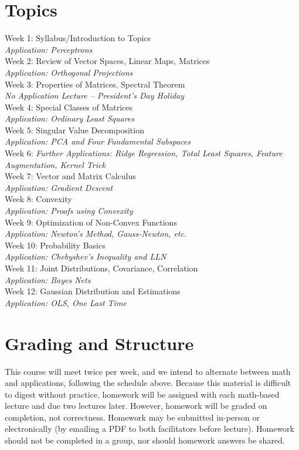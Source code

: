\documentclass{article}
\begin{document}
\section{Topics}
\begin{multicols}{2}
\noindent
Week 1: Syllabus/Introduction to Topics \\
\textit{Application: Perceptrons} \\
Week 2: Review of Vector Spaces, Linear Maps, Matrices \\
\textit{Application: Orthogonal Projections} \\
Week 3: Properties of Matrices, Spectral Theorem \\
\textit{No Application Lecture -- President's Day Holiday}\\
Week 4: Special Classes of Matrices \\
\textit{Application: Ordinary Least Squares} \\
Week 5: Singular Value Decomposition\\
\textit{Application: PCA and Four Fundamental Subspaces} \\
Week 6: \textit{Further Applications: Ridge Regression, Total Least Squares, Feature Augmentation, Kernel Trick} \\
Week 7: Vector and Matrix Calculus \\
\textit{Application: Gradient Descent}\\
Week 8: Convexity \\
\textit{Application: Proofs using Convexity} \\
Week 9: Optimization of Non-Convex Functions \\
\textit{Application: Newton's Method, Gauss-Newton, etc.} \\
Week 10: Probability Basics \\
\textit{Application: Chebyshev's Inequality and LLN} \\
Week 11: Joint Distributions, Covariance, Correlation \\
\textit{Application: Bayes Nets} \\ 
Week 12: Gaussian Distribution and Estimations \\
\textit{Application: OLS, One Last Time}
\end{multicols}

\section{Grading and Structure}
This course will meet twice per week, and we intend to alternate between math and applications, following the schedule above. Because this material is difficult to digest without practice, homework will be assigned with each math-based lecture and due two lectures later. However, homework will be graded on completion, not correctness. Homework may be submitted in-person or electronically (by emailing a PDF to both facilitators before lecture). Homework should not be completed in a group, nor should homework answers be shared. \\
\end{document}
